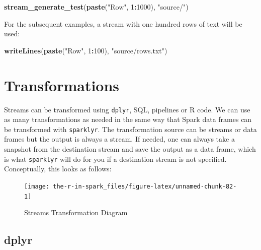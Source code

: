 \documentclass[]{book}
\newenvironment{Shaded}{\begin{snugshade}}{\end{snugshade}}
\newcommand{\DecValTok}[1]{\textcolor[rgb]{0.00,0.00,0.81}{#1}}
\newcommand{\KeywordTok}[1]{\textcolor[rgb]{0.13,0.29,0.53}{\textbf{#1}}}
\newcommand{\NormalTok}[1]{#1}
\newcommand{\OperatorTok}[1]{\textcolor[rgb]{0.81,0.36,0.00}{\textbf{#1}}}
\newcommand{\StringTok}[1]{\textcolor[rgb]{0.31,0.60,0.02}{#1}}
\theoremstyle{definition}
\theoremstyle{definition}
\theoremstyle{definition}
\theoremstyle{remark}
\begin{document}
\begin{Shaded}
\begin{Highlighting}[]
\KeywordTok{stream_generate_test}\NormalTok{(}\KeywordTok{paste}\NormalTok{(}\StringTok{"Row"}\NormalTok{, }\DecValTok{1}\OperatorTok{:}\DecValTok{1000}\NormalTok{), }\StringTok{"source/"}\NormalTok{)}
\end{Highlighting}
\end{Shaded}

For the subsequent examples, a stream with one hundred rows of text will
be used:

\begin{Shaded}
\begin{Highlighting}[]
\KeywordTok{writeLines}\NormalTok{(}\KeywordTok{paste}\NormalTok{(}\StringTok{"Row"}\NormalTok{, }\DecValTok{1}\OperatorTok{:}\DecValTok{100}\NormalTok{), }\StringTok{"source/rows.txt"}\NormalTok{)}
\end{Highlighting}
\end{Shaded}

\hypertarget{transformations}{%
\section{Transformations}\label{transformations}}

Streams can be transformed using \texttt{dplyr}, SQL, pipelines or R
code. We can use as many transformations as needed in the same way that
Spark data frames can be transformed with \texttt{sparklyr}. The
transformation source can be streams or data frames but the output is
always a stream. If needed, one can always take a snapshot from the
destination stream and save the output as a data frame, which is what
\texttt{sparklyr} will do for you if a destination stream is not
specified. Conceptually, this looks as follows:

\begin{figure}

{\centering \texttt{[image: the-r-in-spark\_files/figure-latex/unnamed-chunk-82-1]} 

}

\caption{Streams Transformation Diagram}\label{fig:unnamed-chunk-82}
\end{figure}

\hypertarget{streams-dplyr}{%
\subsection{dplyr}\label{streams-dplyr}}
\end{document}

